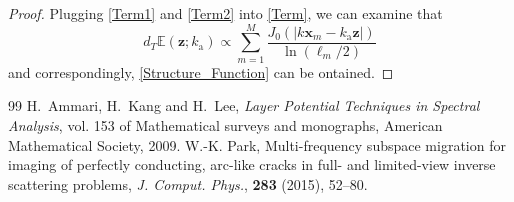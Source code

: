 \documentclass[10pt,a4paper]{amsart}
\newcommand{\ka}{k_{\mathrm{a}}}
\newcommand{\mx}{\mathbf{x}}
\newcommand{\mz}{\mathbf{z}}
\begin{document}
\begin{proof}
Plugging \eqref{Term1} and \eqref{Term2} into \eqref{Term}, we can examine that
\[d_T\mathbb{E}(\mz;\ka)\propto\sum_{m=1}^{M}\frac{J_0(|k\mx_m-\ka\mz|)}{\ln(\ell_m/2)}\]
and correspondingly, \eqref{Structure_Function} can be ontained.
\end{proof}

\begin{thebibliography}{99}
 \newblock H.~Ammari, H.~Kang and H.~Lee, \newblock \emph{Layer Potential Techniques in Spectral Analysis}, vol. 153 of Mathematical surveys and monographs, \newblock American Mathematical Society, 2009.
 \newblock W.-K. Park, \newblock Multi-frequency subspace migration for imaging of perfectly conducting, arc-like cracks in full- and limited-view inverse scattering problems, \newblock \emph{J. Comput. Phys.}, \textbf{283} (2015), 52--80.
\end{thebibliography}
\end{document}
